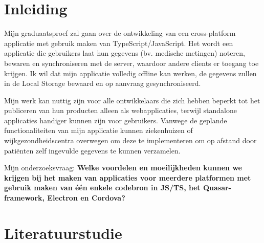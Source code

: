 


% 

\section{Inleiding}%
\label{sec:inleiding}

Mijn graduaatsproef zal gaan over de ontwikkeling van een cross-platform applicatie met gebruik maken van TypeScript/JavaScript. Het wordt een applicatie die gebruikers laat hun gegevens (bv. medische metingen) noteren, bewaren en synchroniseren met de server, waardoor andere clients er toegang toe krijgen. Ik wil dat mijn applicatie volledig offline kan werken, de gegevens zullen in de Local Storage bewaard en op aanvraag gesynchroniseerd.

Mijn werk kan nuttig zijn voor alle ontwikkelaars die zich hebben beperkt tot het publiceren van hun producten alleen als webapplicaties, terwijl standalone applicaties handiger kunnen zijn voor gebruikers. Vanwege de geplande functionaliteiten van mijn applicatie kunnen ziekenhuizen of wijkgezondheidscentra overwegen om deze te implementeren om op afstand door patiënten zelf ingevulde gegevens te kunnen verzamelen.

Mijn onderzoeksvraag:
\textbf{Welke voordelen en moeilijkheden kunnen we krijgen bij het maken van applicaties voor meerdere platformen met gebruik maken van één enkele codebron in JS/TS, het Quasar-framework, Electron en Cordova? } 



\section{Literatuurstudie}%
\label{sec:literatuurstudie}


